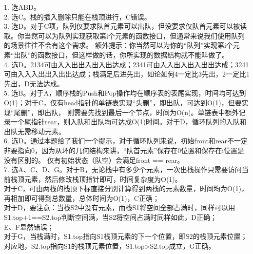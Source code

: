%
%
    1. 选ABD。\\

    2. 选C。栈的插入删除只能在栈顶进行，C错误。\\

    3. 选D。对于C项，队列仅要求队首元素可以出队，但没要求仅队首元素可以被读取。你当然可以为队列实现获取第i个元素的函数接口，但通常来说我们使用队列的场景往往不会有这个需求。
    额外提示：你当然可以为你的“队列”实现第i个元素“出队”的函数接口，但这样做的话，你所实现的数据结构就不能叫做了。\\

    4. 选D。2134可由入入出出入出入出达成；2341可由入入出入出入出出达成；3241可由入入入出出入出出达成；栈满足后进先出，如论如何4一定比3先出，2一定比1先出，D无法达成。\\

    5. 选B。对于A，顺序栈的Push和Pop操作均在顺序表的表尾实现，时间均可达到O(1)；对于C，仅有head指针的单链表实现“头删”，即出队，可达到O(1)，但要实现“尾删”，即出队，
    则需要先找到最后一个节点，时间为O(n)。单链表中额外记录一个尾指针rear，则入队和出队均可达成O(1)时间。对于D，循环队列的入队和出队无需移动元素。\\

    6. 选D。通过本题给了我们一个提示，对于循环队列来说，初始front和rear不一定非要指向0，因为从环的几何结构来讲，“队首元素”保存在0位置和保存在i位置是没有区别的。
    仅有初始状态（队空）会满足front == rear。\\

    7. 选A、C、D、G。对于B，无论栈中有多少个元素，一次出栈操作只需要访问当前栈顶元素，然后修改栈顶指针即可，时间复杂度为O(1)。\\
    对于C，可由两栈的栈顶下标直接分别计算得到两栈的元素数量，时间均为O(1)，再相加即可得到总数量，总体时间为O(1)，C正确；\\
    对于D，要注意：当栈S2中没有元素，而栈S1将空间全部占满时，同样可以用S1.top+1==S2.top判断空间满，当S2将空间占满时同样如此，D正确；\\
    E、F显然错误；\\
    对于G，当栈满时，S1.top指向S1栈顶元素的下一个位置，即S2的栈顶元素位置；对应地，S2.top指向S1的栈顶元素位置，S1.top>S2.top成立，G正确。\\

